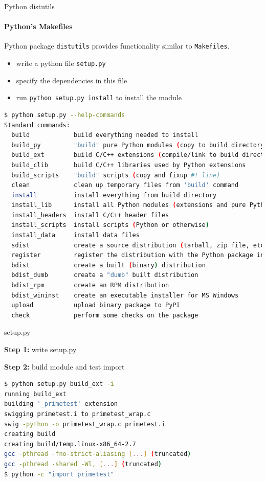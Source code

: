 \documentclass[german]{beamer}
\begin{document}
\begin{frame}[fragile]{Python distutils}
  \framesubtitle{Python's Makefiles}
  Python package {\tt distutils} provides functionality similar to
  {\tt Makefiles}.

  \begin{itemize}
  \item write a python file {\tt setup.py}
  \item specify the dependencies in this file
  \item run {\tt python setup.py install} to install the module
  \end{itemize}

  \begin{lstlisting}[language=bash,basicstyle=\tiny]
$ python setup.py --help-commands
Standard commands:
  build            build everything needed to install
  build_py         "build" pure Python modules (copy to build directory)
  build_ext        build C/C++ extensions (compile/link to build directory)
  build_clib       build C/C++ libraries used by Python extensions
  build_scripts    "build" scripts (copy and fixup #! line)
  clean            clean up temporary files from 'build' command
  install          install everything from build directory
  install_lib      install all Python modules (extensions and pure Python)
  install_headers  install C/C++ header files
  install_scripts  install scripts (Python or otherwise)
  install_data     install data files
  sdist            create a source distribution (tarball, zip file, etc.)
  register         register the distribution with the Python package index
  bdist            create a built (binary) distribution
  bdist_dumb       create a "dumb" built distribution
  bdist_rpm        create an RPM distribution
  bdist_wininst    create an executable installer for MS Windows
  upload           upload binary package to PyPI
  check            perform some checks on the package
  \end{lstlisting}
  
\end{frame}

\begin{frame}[fragile]{setup.py}

{\bf Step 1:} write setup.py

{\bf Step 2:} build module and test import
\begin{lstlisting}[language=bash,basicstyle=\tiny]
$ python setup.py build_ext -i
running build_ext
building '_primetest' extension
swigging primetest.i to primetest_wrap.c
swig -python -o primetest_wrap.c primetest.i
creating build
creating build/temp.linux-x86_64-2.7
gcc -pthread -fno-strict-aliasing [...] (truncated)
gcc -pthread -shared -Wl, [...] (truncated)
$ python -c "import primetest"
\end{lstlisting}

\end{frame}
\end{document}
